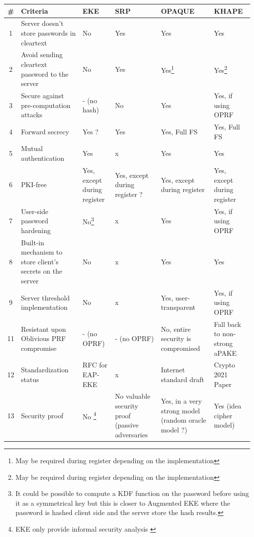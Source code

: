 \documentclass[../report.tex]{subfiles}
\begin{document}
\begin{center}
   \begin{tabular}{ | c | p{6cm} || p{2cm} | p{1cm} | p{2cm} | p{2cm} | }
     \hline
     \textbf{\#} & \textbf{Criteria} & \textbf{EKE} & \textbf{SRP} & \textbf{OPAQUE} & \textbf{KHAPE} \\ \hline
     
     
     
     1 & Server doesn't store passwords in cleartext & No & Yes & Yes & Yes \\ \hline
     2 & Avoid sending cleartext password to the server & No & Yes & Yes\footnote{May be required during register depending on the implementation} & Yes\footnote{May be required during register depending on the implementation} \\ \hline
     
     3 & Secure against pre-computation attacks & - (no hash) & No & Yes & Yes, if using OPRF \\ \hline
     4 & Forward secrecy & Yes ? & Yes & Yes, Full FS & Yes, Full FS \\ \hline
     5 & Mutual authentication & Yes & x & Yes & Yes \\ \hline
     6 & PKI-free & Yes, except during register & Yes, except during register ? & Yes, except during register & Yes, except during register \\ \hline
     7 & User-side password hardening & No\footnote{It could be possible to compute a KDF function on the password before using it as a symmetrical key but this is closer to Augmented EKE \cite{AEKE_Paper} where the password is hashed client side and the server store the hash results.} & x & Yes & Yes, if using OPRF \\ \hline
     8 & Built-in mechanism to store client's secrets on the server & No & x & Yes & Yes \\ \hline
     9 & Server threshold implementation & No & x & Yes, user-transparent & Yes, if using OPRF \\ \hline
     11 & Resistant upon Oblivious PRF compromise & - (no OPRF) & - (no OPRF) & No, entire security is compromised & Fall back to non-strong aPAKE \\ \hline
     12 & Standardization status & RFC for EAP-EKE \cite{EAP_EKE_RFC} & x & Internet standard draft \cite{OPAQUE_Standard_Draft} & Crypto 2021 Paper \cite{KHAPE_Paper} \\ \hline
     13 & Security proof & No \footnote{EKE only provide informal security analysis \cite{``https://eprint.iacr.org/2000/014.pdf''}} & No valuable security proof (passive adversaries \cite{CAA} & Yes, in a very strong model (random oracle model ?) & Yes (idea cipher model) \\ \hline
     
     \end{tabular}
 \end{center}
 
\end{document}
